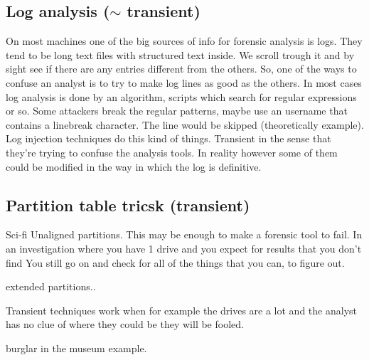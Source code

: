     \subsection{Log analysis ($\sim$ transient)}
        On most machines one of the big sources of info for forensic analysis is logs. They tend to be long text files with structured text inside.
        We scroll trough it and by sight see if there are any entries different from the others.
        So, one of the ways to confuse an analyst is to try to make log lines as good as the others.
        In most cases log analysis is done by an algorithm, scripts which search for regular expressions or so.
        Some attackers break the regular patterns, maybe use an username that contains a linebreak character. The line would be skipped (theoretically example).
        Log injection techniques do this kind of things.
        Transient in the sense that they're trying to confuse the analysis tools. In reality however some of them could be modified in the way in which the log is definitive.
    \subsection{Partition table tricsk (transient)}
        Sci-fi 
        Unaligned partitions. This may be enough to make a forensic tool to fail.
        In an investigation where you have 1 drive and you expect for results that you don't find 
        You still go on and check for all of the things that you can, to figure out.

        extended partitions..

        Transient techniques work when for example the drives are a lot and the analyst has no clue of where they could be 
        they will be fooled.

        burglar in the museum example.

